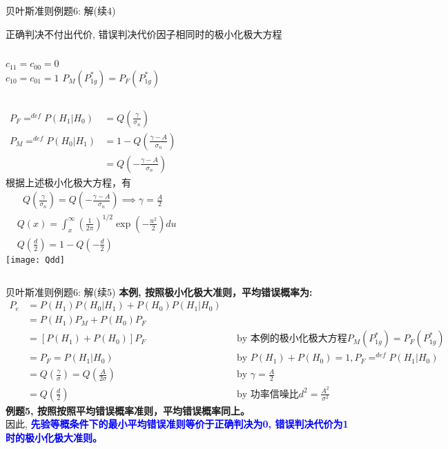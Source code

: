 \begin{frame}[shrink]{贝叶斯准则例题6: 解(续4)}
\begin{block}{正确判决不付出代价, 错误判决代价因子相同时的极小化极大方程}
\begin{columns}
$c_{11}=c_{00}=0$\\
$c_{10}=c_{01}=1$
$P_M(P_{1g}^\ast)=P_F(P_{1g}^\ast)$ 
\end{columns}
\end{block}
\begin{columns}[T]
\small
\begin{align*}
P_F\mathop{=}^{def}P(H_1|H_0)&=Q\left(\frac{\gamma}{\sigma_n}\right)\\
P_M\mathop{=}^{def}P(H_0|H_1)&=1-Q\left(\frac{\gamma-A}{\sigma_n}\right)\\
&=Q\left(-\frac{\gamma-A}{\sigma_n}\right)
\end{align*}
根据上述极小化极大方程，有
\begin{align*}
Q\left(\frac{\gamma}{\sigma_n}\right)=Q\left(-\frac{\gamma-A}{\sigma_n}\right)\implies \gamma=\frac{A}{2}
\end{align*}
\small
\begin{align*}
&Q(x)=\int_{x}^{\infty}\left(\frac{1}{2\pi}\right)^{1/2}\exp\left(-\frac{u^2}{2}\right)du\\
&Q\left(\frac{d}{2}\right) = 1-Q\left(-\frac{d}{2}\right)
\end{align*}
\centering
\texttt{[image: Qdd]}
\end{columns}
\end{frame}

\begin{frame}[shrink]{贝叶斯准则例题6: 解(续5)}
\small
\textbf{本例, 按照极小化极大准则，平均错误概率为:}
\begin{align*}
P_e&=P(H_1)P(H_0|H_1)+P(H_0)P(H_1|H_0)\\
&=P(H_1)P_M+P(H_0)P_F\\
&=[P(H_1)+P(H_0)]P_F &&\text{by 本例的极小化极大方程}P_M(P_{1g}^\ast)=P_F(P_{1g}^\ast)\\
&=P_F=P(H_1|H_0) &&\text{by }P(H_1)+P(H_0)=1, P_F\mathop{=}^{def}P(H_1|H_0)\\
&=Q(\frac{\gamma}{\sigma})=Q\left(\frac{A}{2\sigma}\right) && \text{by }\gamma=\frac{A}{2}\\
&=Q(\frac{d}{2}) &&\text{by 功率信噪比}d^2=\frac{A^2}{\sigma^2}
\end{align*}
\textbf{例题5, 按照按照平均错误概率准则，平均错误概率同上。}\\
因此, \textbf{\textcolor{blue}{先验等概条件下的最小平均错误准则等价于正确判决为0, 错误判决代价为1时的极小化极大准则。}}
\end{frame}

